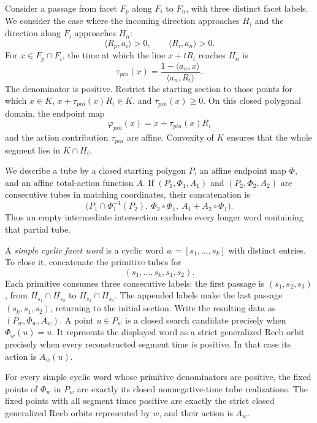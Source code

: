 Consider a passage from facet $F_p$ along $F_i$ to $F_n$, with three
distinct facet labels. We consider the case where the incoming direction
approaches $H_i$ and the direction along $F_i$ approaches $H_n$:
\[
  \langle R_p,a_i\rangle>0,
  \qquad
  \langle R_i,a_n\rangle>0.
\]
For \(x\in F_p\cap F_i\), the time at which the line
\(x+tR_i\) reaches \(H_n\) is
\begin{equation}\label{eq:fg-primitive-time}
  \tau_{pin}(x)
  =\frac{1-\langle a_n,x\rangle}{\langle a_n,R_i\rangle}.
\end{equation}
The denominator is positive.  Restrict the starting section to those points
for which \(x\in K\), \(x+\tau_{pin}(x)R_i\in K\), and
\(\tau_{pin}(x)\geq0\).  On this closed polygonal domain, the endpoint map
\[
  \varphi_{pin}(x)=x+\tau_{pin}(x)R_i
\]
and the action contribution \(\tau_{pin}\) are affine.  Convexity of \(K\)
ensures that the whole segment lies in \(K\cap H_i\).

We describe a tube by a closed starting polygon \(P\), an affine endpoint map
\(\Phi\), and an affine total-action function \(A\).  If
\((P_1,\Phi_1,A_1)\) and \((P_2,\Phi_2,A_2)\) are consecutive tubes in
matching coordinates, their concatenation is
\begin{equation}\label{eq:fg-tube-composition}
  \bigl(P_1\cap\Phi_1^{-1}(P_2),
  \ \Phi_2\circ\Phi_1,
  \ A_1+A_2\circ\Phi_1\bigr).
\end{equation}
Thus an empty intermediate intersection excludes every longer word containing
that partial tube.

A \emph{simple cyclic facet word} is a cyclic word
\(w=[s_1,\ldots,s_k]\) with distinct entries.  To close it, concatenate the
primitive tubes for
\[
  (s_1,\ldots,s_k,s_1,s_2).
\]
Each primitive consumes three consecutive labels: the first passage is
\((s_1,s_2,s_3)\), from \(H_{s_1}\cap H_{s_2}\) to
\(H_{s_2}\cap H_{s_3}\).  The appended labels make the last passage
\((s_k,s_1,s_2)\), returning to the initial section.
Write the resulting data as \((P_w,\Phi_w,A_w)\).  A point
\(u\in P_w\) is a closed search candidate precisely when
\(\Phi_w(u)=u\).  It represents the displayed word as a strict generalized
Reeb orbit precisely when every reconstructed segment time is positive.  In
that case its action is \(A_w(u)\).

\begin{lemma}\label{lem:flow-graph-tube-semantics}
For every simple cyclic word whose primitive denominators are positive, the
fixed points of \(\Phi_w\) in \(P_w\) are exactly its closed nonnegative-time
tube realizations.  The fixed points with all segment times positive are
exactly the strict closed generalized Reeb orbits represented by \(w\), and
their action is \(A_w\).
\end{lemma}

